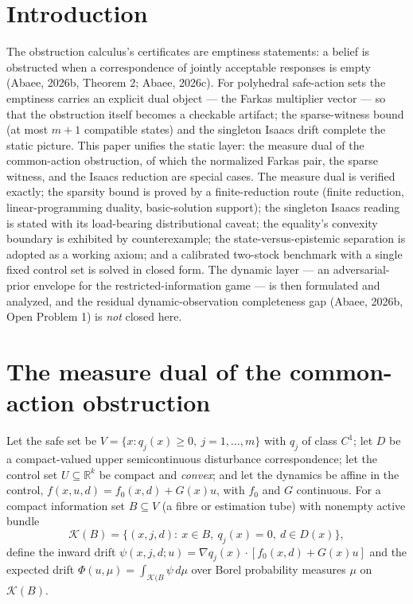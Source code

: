 \documentclass[10pt,twocolumn]{article}
\theoremstyle{definition}
\begin{document}
\section{Introduction}

The obstruction calculus's certificates are emptiness statements: a belief is
obstructed when a correspondence of jointly acceptable responses is empty
(Abaee, 2026b, Theorem 2; Abaee, 2026c). For polyhedral safe-action sets the
emptiness carries an explicit dual object --- the Farkas multiplier vector
--- so that the obstruction itself becomes a checkable artifact; the
sparse-witness bound (at most $m+1$ compatible states) and the singleton
Isaacs drift complete the static picture. This paper unifies the static layer: the measure dual of the common-action obstruction, of which the normalized Farkas pair, the sparse witness, and the Isaacs reduction are special cases. The measure dual is verified exactly; the sparsity bound is proved by a finite-reduction route (finite reduction, linear-programming duality, basic-solution support); the singleton Isaacs reading is stated with its load-bearing distributional caveat; the equality's convexity boundary is exhibited by counterexample; the state-versus-epistemic separation is adopted as a working axiom; and a calibrated two-stock benchmark with a single fixed control set is solved in closed form. The dynamic layer --- an adversarial-prior envelope for the restricted-information game --- is then formulated and analyzed, and the residual dynamic-observation completeness gap (Abaee, 2026b, Open Problem 1) is \emph{not} closed here.

\section{The measure dual of the common-action obstruction}

Let the safe set be $V = \{x: q_{j}(x) \ge 0,\ j = 1,\dots,m\}$ with
$q_{j}$ of class $C^{1}$; let $D$ be a compact-valued upper
semicontinuous disturbance correspondence; let the control set
$U \subseteq \mathbb{R}^{k}$ be compact and \emph{convex}; and let the
dynamics be affine in the control,
$f(x,u,d) = f_{0}(x,d) + G(x)u$, with $f_{0}$ and $G$ continuous. For a
compact information set $B \subseteq V$ (a fibre or estimation tube) with
nonempty active bundle
\[
\mathcal{K}(B) = \{(x,j,d):\ x \in B,\ q_{j}(x) = 0,\ d \in D(x)\},
\]
define the inward drift
$\psi(x,j,d;u) = \nabla q_{j}(x)\cdot[f_{0}(x,d) + G(x)u]$ and the
expected drift $\Phi(u,\mu) = \int_{\mathcal{K}(B} \psi \,d\mu$ over
Borel probability measures $\mu$ on $\mathcal{K}(B)$.
\end{document}
